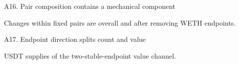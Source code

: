 \begin{frame}{A16. Pair composition contains a mechanical component}
\vspace{-0.10cm}
\begin{center}
\resizebox{0.90\textwidth}{!}{}
\end{center}
\vspace{-0.08cm}
{\large Changes within fixed pairs are \WethCountWithinFullChange{} overall and \WethCountWithinNoEndpointChange{} after removing WETH endpoints.\par}
\end{frame}

\begin{frame}{A17. Endpoint direction splits count and value}
\vspace{-0.12cm}
\begin{center}
\resizebox{0.94\textwidth}{!}{}
\end{center}
\vspace{-0.08cm}
{\large USDT supplies \StableStableUsdtValueContribution{} of the \StableStableValueContribution{} two-stable-endpoint value channel.\par}
\end{frame}

